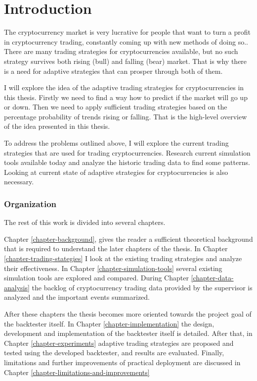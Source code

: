
\chapter{Introduction}

The cryptocurrency market is very lucrative for people that want to turn a profit in cryptocurrency trading, constantly coming up with new methods of doing so.. There are many trading strategies for cryptocurrencies available, but no such strategy survives both rising (bull) and falling (bear) market. That is why there is a need for adaptive strategies that can prosper through both of them.

I will explore the idea of the adaptive trading strategies for cryptocurrencies in this thesis. Firstly we need to find a way how to predict if the market will go up or down. Then we need to apply sufficient trading strategies based on the percentage probability of trends rising or falling. That is the high-level overview of the idea presented in this thesis.

To address the problems outlined above, I will explore the current trading strategies that are used for trading cryptocurrencies. Research current simulation tools available today and analyze the historic trading data to find some patterns. Looking at current state of adaptive strategies for cryptocurrencies is also necessary.

\subsection*{Organization}

The rest of this work is divided into several chapters.

Chapter \ref{chapter-background}, gives the reader a sufficient theoretical background that is required to understand the later chapters of the thesis. In Chapter \ref{chapter-trading-stategies} I look at the existing trading strategies and analyze their effectiveness. In Chapter \ref{chapter-simulation-tools} several existing simulation tools are explored and compared. During Chapter \ref{chapter-data-analysis} the backlog of cryptocurrency trading data provided by the supervisor is analyzed and the important events summarized.

After these chapters the thesis becomes more oriented towards the project goal of the backtester itself. In Chapter \ref{chapter-implementation} the design, development and implementation of the backtester itself is detailed. After that, in Chapter \ref{chapter-experiments} adaptive trading strategies are proposed and tested using the developed backtester, and results are evaluated. Finally, limitations and further improvements of practical deployment are discussed in Chapter \ref{chapter-limitations-and-improvements}

